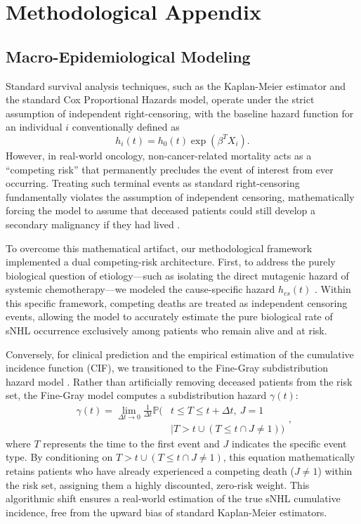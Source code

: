 \documentclass[a4paper,11pt,twocolumn]{article}
\begin{document}
	\section{Methodological Appendix}
	\label{app:methodology}
	
	\subsection{Macro-Epidemiological Modeling}
	Standard survival analysis techniques, such as the Kaplan-Meier estimator and the standard Cox Proportional Hazards model, operate under the strict assumption of independent right-censoring, with the baseline hazard function for an individual $i$ conventionally defined as \cite{Cox1972} $$h_i(t) = h_0(t) \exp(\beta^T X_i).$$ However, in real-world oncology, non-cancer-related mortality acts as a ``competing risk'' that permanently precludes the event of interest from ever occurring. Treating such terminal events as standard right-censoring fundamentally violates the assumption of independent censoring, mathematically forcing the model to assume that deceased patients could still develop a secondary malignancy if they had lived \cite{Dignam2012, Austin2016}.
	
	To overcome this mathematical artifact, our methodological framework implemented a dual competing-risk architecture. First, to address the purely biological question of etiology—such as isolating the direct mutagenic hazard of systemic chemotherapy—we modeled the cause-specific hazard $h_{cs}(t)$ \cite{Andersen2012}. Within this specific framework, competing deaths are treated as independent censoring events, allowing the model to accurately estimate the pure biological rate of sNHL occurrence exclusively among patients who remain alive and at risk. 
	
	Conversely, for clinical prediction and the empirical estimation of the cumulative incidence function (CIF), we transitioned to the Fine-Gray subdistribution hazard model \cite{Fine1999}. Rather than artificially removing deceased patients from the risk set, the Fine-Gray model computes a subdistribution hazard $\gamma(t)$:
	\begin{equation*}
		\begin{split}
			\gamma(t) = \lim_{\Delta t \to 0} \frac{1}{\Delta t} \mathbb{P} \big( &t \le T \le t+\Delta t,\ J=1 \\
			&\mid T > t \cup (T \le t \cap J \neq 1) \big)
		\end{split},
	\end{equation*}
	where $T$ represents the time to the first event and $J$ indicates the specific event type. By conditioning on $T > t \cup (T \le t \cap J \neq 1)$, this equation mathematically retains patients who have already experienced a competing death ($J \neq 1$) within the risk set, assigning them a highly discounted, zero-risk weight. This algorithmic shift ensures a real-world estimation of the true sNHL cumulative incidence, free from the upward bias of standard Kaplan-Meier estimators.
	
\end{document}
